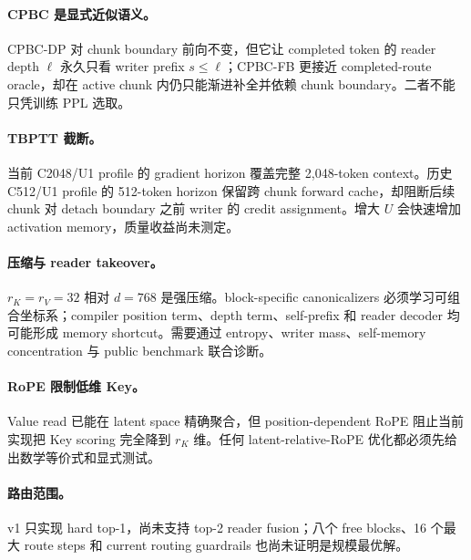 \documentclass[UTF8,twocolumn,10pt,a4paper]{ctexart}
\newcommand{\DP}{\textsf{CPBC-DP}}
\newcommand{\FB}{\textsf{CPBC-FB}}
\begin{document}
\paragraph{CPBC 是显式近似语义。}
\DP{} 对 chunk boundary 前向不变，但它让 completed token 的 reader depth $\ell$ 永久只看 writer prefix $s\le\ell$；\FB{} 更接近 completed-route oracle，却在 active chunk 内仍只能渐进补全并依赖 chunk boundary。二者不能只凭训练 PPL 选取。

\paragraph{TBPTT 截断。}
当前 C2048/U1 profile 的 gradient horizon 覆盖完整 2,048-token context。历史 C512/U1 profile 的 512-token horizon 保留跨 chunk forward cache，却阻断后续 chunk 对 detach boundary 之前 writer 的 credit assignment。增大 $U$ 会快速增加 activation memory，质量收益尚未测定。

\paragraph{压缩与 reader takeover。}
$r_K=r_V=32$ 相对 $d=768$ 是强压缩。block-specific canonicalizers 必须学习可组合坐标系；compiler position term、depth term、self-prefix 和 reader decoder 均可能形成 memory shortcut。需要通过 entropy、writer mass、self-memory concentration 与 public benchmark 联合诊断。

\paragraph{RoPE 限制低维 Key。}
Value read 已能在 latent space 精确聚合，但 position-dependent RoPE 阻止当前实现把 Key scoring 完全降到 $r_K$ 维。任何 latent-relative-RoPE 优化都必须先给出数学等价式和显式测试。

\paragraph{路由范围。}
v1 只实现 hard top-1，尚未支持 top-2 reader fusion；八个 free blocks、16 个最大 route steps 和 current routing guardrails 也尚未证明是规模最优解。
\end{document}
